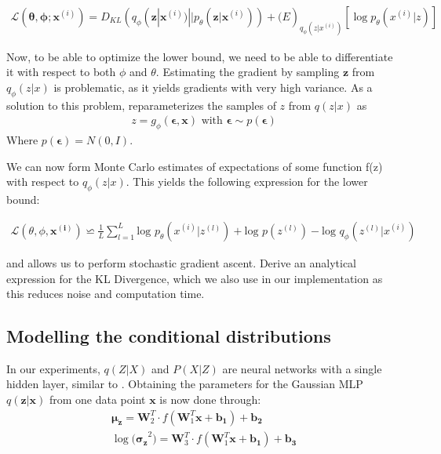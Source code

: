 \documentclass{article}
\begin{document}
\begin{align}
\mathcal{L}(\mathbf{\theta}, \mathbf{\phi}; \mathbf{x}^{(i)}) = D_{KL}(q_\phi(\mathbf{z}|\mathbf{x}^{(i)}) || p_\theta(\mathbf{z}|\mathbf{x}^{(i)})) + \mathcal(E)_{q_\phi(z|x^{(i)})} [\log p_\theta(x^{(i)}|z)]
\end{align}

Now, to be able to optimize the lower bound, we need to be able to differentiate it with respect to both $\phi$ and $\theta$. Estimating the gradient by sampling $\mathbf{z}$ from $q_{\phi}(z|x)$ is problematic, as it yields gradients with very high variance. As a solution to this problem, \cite{kingma2013auto} reparameterizes the samples of $z$ from $q(z|x)$ as
\begin{align}
z = g_\phi(\mathbf{\epsilon},\mathbf{x}) \text{  with  } \mathbf{\epsilon} \sim p(\mathbf{\epsilon}) 
\end{align} 
Where $p(\mathbf{\epsilon}) = N(0,I)$.

We can now form Monte Carlo estimates of expectations of some function f(z) with respect to $q_\phi(z|x)$. This yields the following expression for the lower bound:

\begin{align}
\mathcal{L}(\theta ,\phi ,  \mathbf{x^{(i)}}) \backsimeq \frac{1}{L} \sum_{l=1}^{L} \text{log } p_{\theta} (x^{(i)}|z^{(l)})+ \text{log }p(z^{(l)}	)-\text{log }q_{\phi}(z^{(l)}|x^{(i)})
\end{align}

and allows us to perform stochastic gradient ascent. \cite{kingma2013auto} Derive an analytical expression for the KL Divergence, which we also use in our implementation as this reduces noise and computation time. 

\subsection{Modelling the conditional distributions}
In our experiments, $q(Z|X)$ and $P(X|Z)$ are neural networks with a single hidden layer, similar to \cite{kingma2013auto}.  Obtaining the parameters for the Gaussian MLP $q(\mathbf{z}|\mathbf{x})$ from one data point $\mathbf{x}$ is now done through:
\begin{align}
\mathbf{\mu_z} = \mathbf{W}_2^T \cdot f(\mathbf{W}_1^T\mathbf{x}+\mathbf{b_1})+\mathbf{b_2} \\
\log\mathbf{(\sigma_z}^2) = \mathbf{W}_3^T \cdot f(\mathbf{W}_1^T\mathbf{x}+\mathbf{b_1})+\mathbf{b_3}
\end{align} 
 
\end{document}
